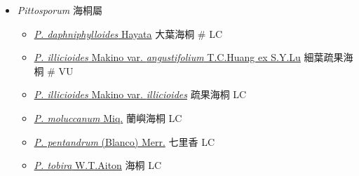 
  \begin{itemize}
 \item[] \textit{Pittosporum} 海桐屬
                                
  \begin{itemize}
        \item[] \href{http://www.theplantlist.org/tpl1.1/search?q=Pittosporum+daphniphylloides}{\textit{P. daphniphylloides} Hayata}   大葉海桐  \# LC
        \item[] \href{http://www.theplantlist.org/tpl1.1/search?q=Pittosporum+illicioides+var.+angustifolium}{\textit{P. illicioides} Makino var. \textit{angustifolium} T.C.Huang ex S.Y.Lu}   細葉疏果海桐  \# VU
        \item[] \href{http://www.theplantlist.org/tpl1.1/search?q=Pittosporum+illicioides+var.+illicioides}{\textit{P. illicioides} Makino var. \textit{illicioides}}   疏果海桐   LC
        \item[] \href{http://www.theplantlist.org/tpl1.1/search?q=Pittosporum+moluccanum}{\textit{P. moluccanum} Miq.}   蘭嶼海桐   LC
        \item[] \href{http://www.theplantlist.org/tpl1.1/search?q=Pittosporum+pentandrum}{\textit{P. pentandrum} (Blanco) Merr.}   七里香   LC
        \item[] \href{http://www.theplantlist.org/tpl1.1/search?q=Pittosporum+tobira}{\textit{P. tobira} W.T.Aiton}   海桐   LC
  \end{itemize}
  \end{itemize}
